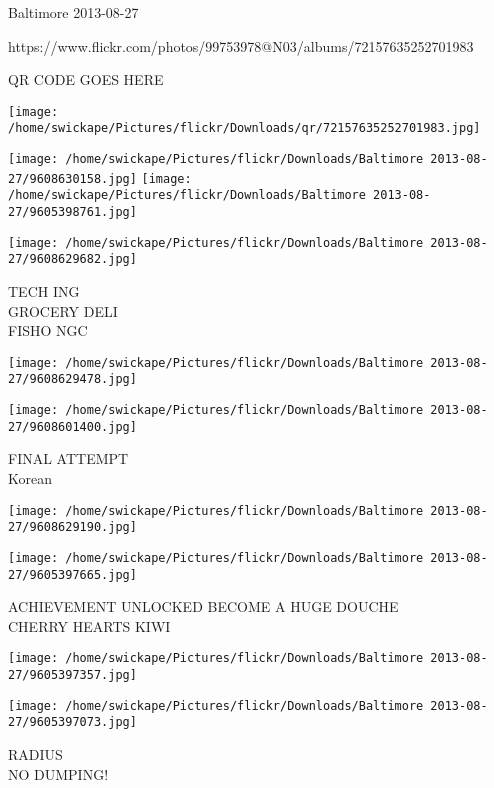 \documentclass[10pt,letterpaper]{article}
\begin{document}
Baltimore 2013-08-27

https://www.flickr.com/photos/99753978@N03/albums/72157635252701983

QR CODE GOES HERE

\texttt{[image: /home/swickape/Pictures/flickr/Downloads/qr/72157635252701983.jpg]}
\pagebreak

\texttt{[image: /home/swickape/Pictures/flickr/Downloads/Baltimore 2013-08-27/9608630158.jpg]}
\texttt{[image: /home/swickape/Pictures/flickr/Downloads/Baltimore 2013-08-27/9605398761.jpg]}

\texttt{[image: /home/swickape/Pictures/flickr/Downloads/Baltimore 2013-08-27/9608629682.jpg]}

TECH ING\\
GROCERY DELI\\
FISHO NGC\\
\pagebreak

\texttt{[image: /home/swickape/Pictures/flickr/Downloads/Baltimore 2013-08-27/9608629478.jpg]}

\vspace{0.25in}
\texttt{[image: /home/swickape/Pictures/flickr/Downloads/Baltimore 2013-08-27/9608601400.jpg]}

FINAL ATTEMPT\\
Korean\\
\pagebreak

\texttt{[image: /home/swickape/Pictures/flickr/Downloads/Baltimore 2013-08-27/9608629190.jpg]}

\vspace{0.25in}
\texttt{[image: /home/swickape/Pictures/flickr/Downloads/Baltimore 2013-08-27/9605397665.jpg]}

ACHIEVEMENT UNLOCKED BECOME A HUGE DOUCHE\\
CHERRY HEARTS KIWI\\
\pagebreak

\texttt{[image: /home/swickape/Pictures/flickr/Downloads/Baltimore 2013-08-27/9605397357.jpg]}

\vspace{0.25in}
\texttt{[image: /home/swickape/Pictures/flickr/Downloads/Baltimore 2013-08-27/9605397073.jpg]}

RADIUS\\
NO DUMPING!\\
\pagebreak
\end{document}
